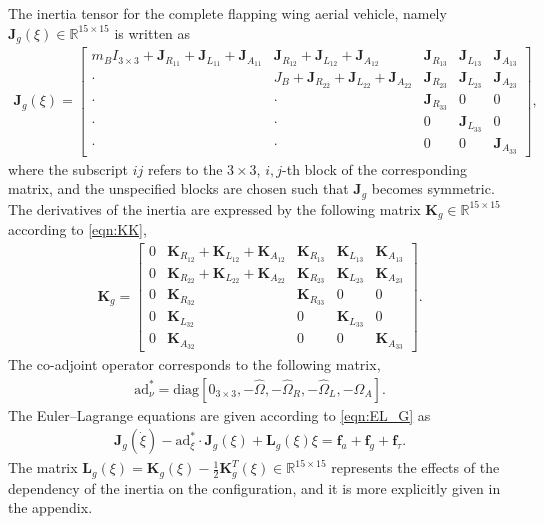 \documentclass[conf]{new-aiaa}
\renewcommand{\Re}{\ensuremath{\mathbb{R}}}
\newcommand{\ad}{\ensuremath{\mathrm{ad}}}
\begin{document}
The inertia tensor for the complete flapping wing aerial vehicle, namely $\mathbf{J}_g(\xi)\in\Re^{15\times 15}$ is written as
\begin{align}
    \mathbf{J}_g(\xi) = \begin{bmatrix}
        m_B I_{3\times 3} + \mathbf{J}_{R_{11}} + \mathbf{J}_{L_{11}} + \mathbf{J}_{A_{11}}
        & \mathbf{J}_{R_{12 }} + \mathbf{J}_{L_{12}} + \mathbf{J}_{A_{12}}
        & \mathbf{J}_{R_{13 }}
        & \mathbf{J}_{L_{13}} 
        & \mathbf{J}_{A_{13}} \\
        \cdot & J_B + \mathbf{J}_{R_{22}} + \mathbf{J}_{L_{22}} + \mathbf{J}_{A_{22}}
        & \mathbf{J}_{R_{23}} 
        & \mathbf{J}_{L_{23}} 
        & \mathbf{J}_{A_{23}} \\
        \cdot & \cdot &  \mathbf{J}_{R_{33}}
              & 0 & 0 \\
        \cdot & \cdot & 0
              & \mathbf{J}_{L_{33}} & 0 \\
        \cdot & \cdot & 0 & 0 & \mathbf{J}_{A_{33}}
    \end{bmatrix},
\end{align}
where the subscript $ij$ refers to the $3\times 3$, $i,j$-th block of the corresponding matrix, and the unspecified blocks are chosen such that $\mathbf{J}_g$ becomes symmetric.
The derivatives of the inertia are expressed by the following matrix $\mathbf{K}_g\in\Re^{15\times 15}$ according to \eqref{eqn:KK}, 
\begin{align}
    \mathbf{K}_g = \begin{bmatrix}
        0 & \mathbf{K}_{R_{12}} + \mathbf{K}_{L_{12}} + \mathbf{K}_{A_{12}} & \mathbf{K}_{R_{13}} & \mathbf{K}_{L_{13}} & \mathbf{K}_{A_{13}}\\
        0 & \mathbf{K}_{R_{22}} + \mathbf{K}_{L_{22}} + \mathbf{K}_{A_{22}} & \mathbf{K}_{R_{23}} & \mathbf{K}_{L_{23}} & \mathbf{K}_{A_{23}} \\
        0 & \mathbf{K}_{R_{32}} & \mathbf{K}_{R_{33}} & 0 & 0 \\
        0 & \mathbf{K}_{L_{32}} & 0 & \mathbf{K}_{L_{33}} & 0 \\
        0 & \mathbf{K}_{A_{32}} & 0 & 0 & \mathbf{K}_{A_{33}}
    \end{bmatrix}.
\end{align}
The co-adjoint operator corresponds to the following matrix,
\begin{align}
    \mathrm{ad}^*_\nu = \mathrm{diag}[0_{3\times 3}, -\hat\Omega, -\hat\Omega_R, -\hat\Omega_L, - \hat\Omega_A].
\end{align}
The Euler--Lagrange equations are given according to \eqref{eqn:EL_G} as
\begin{gather}
    \mathbf{J}_g(\dot \xi) - \ad^*_\xi \cdot \mathbf{J}_g(\xi) + \mathbf{L}_g(\xi) \xi  = \mathbf{f}_a + \mathbf{f}_g + \mathbf{f}_\tau. \label{eqn:EL}
\end{gather}
The matrix  $\mathbf{L}_g(\xi) = \mathbf{K}_g(\xi)  - \frac{1}{2}\mathbf{K}^T_g(\xi)\in\Re^{15\times 15}$ represents the effects of the dependency of the inertia on the configuration, 
and it is more explicitly given in the appendix. 
\end{document}
